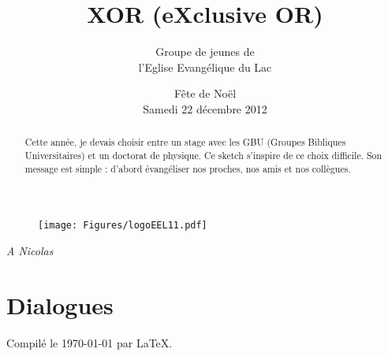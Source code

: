 \documentclass[12pt]{article}
\title{\textsf{XOR (eXclusive OR)}}
\author{Groupe de jeunes de \\ l'Eglise Evangélique du Lac}
\date{Fête de Noël \\ Samedi 22 décembre 2012}
\begin{document}
\maketitle

	\begin{figure}[htb]
	\centering
	\texttt{[image: Figures/logoEEL11.pdf]}
	\end{figure}

\newpage

\begin{center}
\textit{A Nicolas}
\end{center}

\vfill

\begin{abstract}
Cette année, je devais choisir entre un stage avec les GBU
(Groupes Bibliques Universitaires) et un doctorat de physique.
Ce sketch s'inspire de ce choix difficile.
Son message est simple : d'abord évangéliser nos proches,
nos amis et nos collègues.
\end{abstract}

\setcounter{tocdepth}{2}
\tableofcontents

\vfill

\newpage



\newpage

\section{Dialogues}

	
	
	
	
\newpage
	


\vfill

\begin{center}
Compilé le \today{} par \LaTeX{}.
\end{center}
\end{document}
